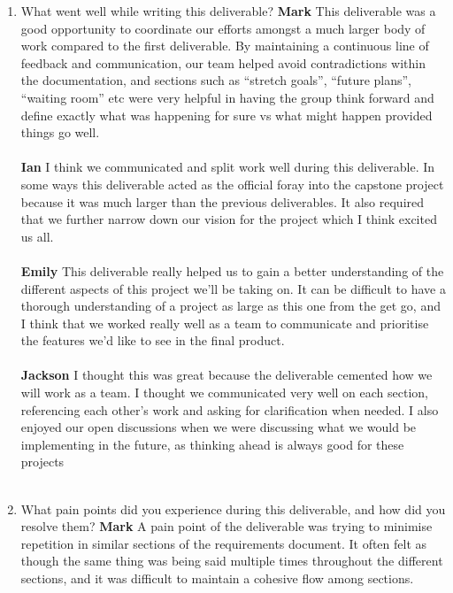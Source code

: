 \begin{enumerate}
  \item What went well while writing this deliverable? 
  \textbf{Mark} This deliverable was a good opportunity to coordinate our efforts amongst a much larger body of work compared to the first deliverable. By maintaining a continuous line of feedback and communication, our team helped avoid contradictions within the documentation, and sections such as “stretch goals”, “future plans”, “waiting room” etc were very helpful in having the group think forward and define exactly what was happening for sure vs what might happen provided things go well.\\ \\
  \textbf{Ian}  I think we communicated and split work well during this deliverable. In some ways this deliverable acted as the official foray into the capstone project because it was much larger than the previous deliverables. It also required that we further narrow down our vision for the project which I think excited us all.  \\ \\
  \textbf{Emily} This deliverable really helped us to gain a better understanding of the different aspects of this project we’ll be taking on. It can be difficult to have a thorough understanding of a project as large as this one from the get go, and I think that we worked really well as a team to communicate and prioritise the features we’d like to see in the final product.\\ \\
  \textbf{Jackson}  I thought this was great because the deliverable cemented how we will work as a team. I thought we communicated very well on each section, referencing each other’s work and asking for clarification when needed. I also enjoyed our open discussions when we were discussing what we would be implementing in the future, as thinking ahead is always good for these projects \\ \\
  \item What pain points did you experience during this deliverable, and how did
  you resolve them?
  \textbf{Mark} A pain point of the deliverable was trying to minimise repetition in similar sections of the requirements document. It often felt as though the same thing was being said multiple times throughout the different sections, and it was difficult to maintain a cohesive flow among sections.\\ \\ 

\end{enumerate}
